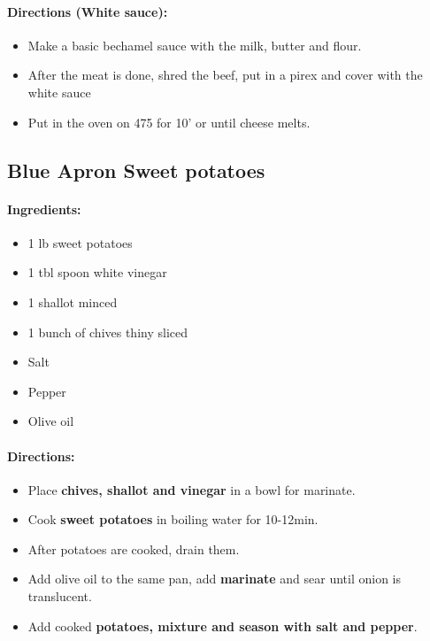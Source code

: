 \documentclass{article}
\begin{document}
\paragraph{Directions (White sauce):}
\begin{itemize}
	\item Make a basic bechamel sauce with the milk, butter and flour.
	\item After the meat is done, shred the beef, put in a pirex and cover with the white sauce
	\item Put in the oven on 475 for 10' or until cheese melts.
\end{itemize}

\subsection{Blue Apron Sweet potatoes}

\paragraph{Ingredients:}

\begin{itemize}
	\item 1 lb sweet potatoes
	\item 1 tbl spoon white vinegar
	\item 1 shallot minced
	\item 1 bunch of chives thiny sliced
	\item Salt
	\item Pepper
	\item Olive oil
\end{itemize}

\paragraph{Directions:}
\begin{itemize}
	\item Place \textbf{chives, shallot and vinegar} in a bowl for marinate.
	\item Cook \textbf{sweet potatoes} in boiling water for 10-12min.
	\item After potatoes are cooked, drain them.
	\item Add olive oil to the same pan, add \textbf{marinate} and sear until onion is translucent.
	\item Add cooked \textbf{potatoes, mixture and season with salt and pepper}.
\end{itemize}
\end{document}
